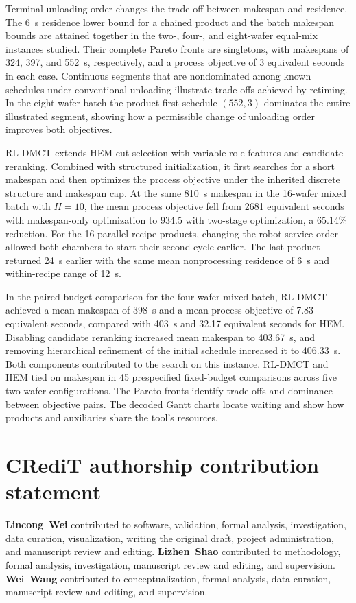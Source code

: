 \documentclass[final,5p,times,twocolumn]{elsarticle}
\begin{document}
Terminal unloading order changes the trade-off between makespan and residence. The 6~s residence lower bound for a chained product and the batch makespan bounds are attained together in the two-, four-, and eight-wafer equal-mix instances studied. Their complete Pareto fronts are singletons, with makespans of 324, 397, and 552~s, respectively, and a process objective of 3 equivalent seconds in each case. Continuous segments that are nondominated among known schedules under conventional unloading illustrate trade-offs achieved by retiming. In the eight-wafer batch the product-first schedule $(552,3)$ dominates the entire illustrated segment, showing how a permissible change of unloading order improves both objectives.

RL-DMCT extends HEM cut selection with variable-role features and candidate reranking. Combined with structured initialization, it first searches for a short makespan and then optimizes the process objective under the inherited discrete structure and makespan cap. At the same 810~s makespan in the 16-wafer mixed batch with $H=10$, the mean process objective fell from 2681 equivalent seconds with makespan-only optimization to 934.5 with two-stage optimization, a 65.14\% reduction. For the 16 parallel-recipe products, changing the robot service order allowed both chambers to start their second cycle earlier. The last product returned 24~s earlier with the same mean nonprocessing residence of 6~s and within-recipe range of 12~s.

In the paired-budget comparison for the four-wafer mixed batch, RL-DMCT achieved a mean makespan of 398~s and a mean process objective of 7.83 equivalent seconds, compared with 403~s and 32.17 equivalent seconds for HEM. Disabling candidate reranking increased mean makespan to 403.67~s, and removing hierarchical refinement of the initial schedule increased it to 406.33~s. Both components contributed to the search on this instance. RL-DMCT and HEM tied on makespan in 45 prespecified fixed-budget comparisons across five two-wafer configurations. The Pareto fronts identify trade-offs and dominance between objective pairs. The decoded Gantt charts locate waiting and show how products and auxiliaries share the tool's resources.

\section*{CRediT authorship contribution statement}
\textbf{Lincong~Wei} contributed to software, validation, formal analysis, investigation, data curation, visualization, writing the original draft, project administration, and manuscript review and editing.
\textbf{Lizhen~Shao} contributed to methodology, formal analysis, investigation, manuscript review and editing, and supervision.
\textbf{Wei~Wang} contributed to conceptualization, formal analysis, data curation, manuscript review and editing, and supervision.
\end{document}
